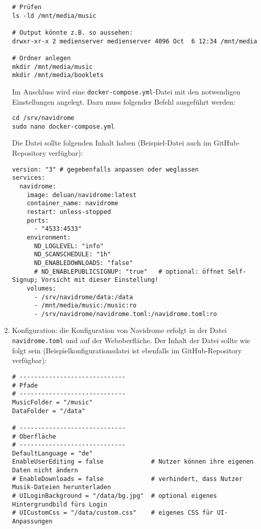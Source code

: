 \documentclass[12pt,a4paper]{report}
\begin{document}
\begin{enumerate}
\begin{verbatim}
# Prüfen
ls -ld /mnt/media/music

# Output könnte z.B. so aussehen:
drwxr-xr-x 2 medienserver medienserver 4096 Oct  6 12:34 /mnt/media

# Ordner anlegen
mkdir /mnt/media/music
mkdir /mnt/media/booklets
\end{verbatim}

    Im Anschluss wird eine \texttt{docker-compose.yml}-Datei mit den notwendigen Einstellungen angelegt. 
    Dazu muss folgender Befehl ausgeführt werden:

    \begin{verbatim}
cd /srv/navidrome
sudo nano docker-compose.yml
    \end{verbatim}

    Die Datei sollte folgenden Inhalt haben (Beispiel-Datei auch im GitHub-Repository verfügbar):
    
    \begin{verbatim}
version: "3" # gegebenfalls anpassen oder weglassen
services:
  navidrome:
    image: deluan/navidrome:latest
    container_name: navidrome
    restart: unless-stopped
    ports:
      - "4533:4533"
    environment:
      ND_LOGLEVEL: "info"
      ND_SCANSCHEDULE: "1h"
      ND_ENABLEDOWNLOADS: "false"
      # ND_ENABLEPUBLICSIGNUP: "true"   # optional: öffnet Self-Signup; Vorsicht mit dieser Einstellung!
    volumes:
      - /srv/navidrome/data:/data
      - /mnt/media/music:/music:ro
      - /srv/navidrome/navidrome.toml:/navidrome.toml:ro
    \end{verbatim}

    \item Konfiguration:
    die Konfiguration von Navidrome erfolgt in der Datei \texttt{navidrome.toml} und auf der Weboberfläche.
    Der Inhalt der Datei sollte wie folgt sein (Beispielkonfigurationsdatei ist ebenfalls im GitHub-Repository verfügbar):
  
    \begin{verbatim}
# -----------------------------
# Pfade
# -----------------------------
MusicFolder = "/music"
DataFolder = "/data"

# -----------------------------
# Oberfläche
# -----------------------------
DefaultLanguage = "de"
EnableUserEditing = false             # Nutzer können ihre eigenen Daten nicht ändern
# EnableDownloads = false             # verhindert, dass Nutzer Musik-Dateien herunterladen
# UILoginBackground = "/data/bg.jpg"  # optional eigenes Hintergrundbild fürs Login
# UICustomCss = "/data/custom.css"    # eigenes CSS für UI-Anpassungen


\end{verbatim}
\end{enumerate}
\end{document}
